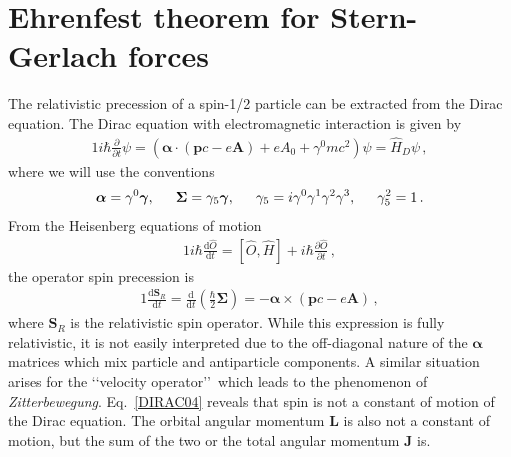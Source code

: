 \section{Ehrenfest theorem for Stern-Gerlach forces}
\noindent The relativistic precession of a spin-1/2 particle can be extracted from the Dirac equation. The Dirac equation with electromagnetic interaction is given by
\begin{alignat}{1}
  \label{DIRAC01} i\hbar\frac{\partial}{\partial t}\psi=\left(\boldsymbol{\alpha}\cdot\left(\mathbf{p}c-e\mathbf{A}\right)+eA_{0}+\gamma^{0}mc^{2}\right)\psi=\hat{H}_{D}\psi\,,
\end{alignat}
where we will use the conventions
\begin{alignat}{1}
  \label{DIRAC02} \boldsymbol{\alpha}=\gamma^{0}\boldsymbol{\gamma},\indent\boldsymbol{\Sigma}=\gamma_{5}\boldsymbol{\gamma},\indent\gamma_{5}=i\gamma^{0}\gamma^{1}\gamma^{2}\gamma^{3},\indent\gamma_{5}^{2}=1\,.
\end{alignat}
From the Heisenberg equations of motion
\begin{alignat}{1}
  \label{DIRAC03} i\hbar\frac{\mathrm{d}\hat{O}}{\mathrm{d}t}=[\hat{O},\hat{H}]+i\hbar\frac{\partial\hat{O}}{\partial t}\,,
\end{alignat}
the operator spin precession is
\begin{alignat}{1}
  \label{DIRAC04} \frac{\mathrm{d}\mathbf{S}_{R}}{\mathrm{d}t}=\frac{\mathrm{d}}{\mathrm{d}t}\left(\frac{\hbar}{2}\boldsymbol{\Sigma}\right)=-\boldsymbol{\alpha}\times\left(\mathbf{p}c-e\mathbf{A}\right)\,,
\end{alignat}
where $\mathbf{S}_{R}$ is the relativistic spin operator. While this expression is fully relativistic, it is not easily interpreted due to the off-diagonal nature of the $\boldsymbol{\alpha}$ matrices which mix particle and antiparticle components. A similar situation arises for the \lq\lq velocity operator\rq\rq\, which leads to the phenomenon of \emph{Zitterbewegung}. Eq.~\eqref{DIRAC04} reveals that spin is not a constant of motion of the Dirac equation. The orbital angular momentum $\mathbf{L}$ is also not a constant of motion, but the sum of the two or the total angular momentum $\mathbf{J}$ is.
